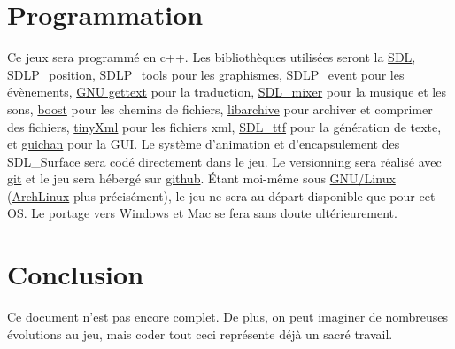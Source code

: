 \documentclass{article}
\begin{document}
\section{Programmation}
Ce jeux sera programmé en c++. Les bibliothèques utilisées seront la \href{http://www.libsdl.org/}{SDL}, \href{https://github.com/lucas8/SDLP\_position}{SDLP\_position}, \href{https://github.com/lucas8/SDLP\_tools}{SDLP\_tools} pour les graphismes, 
\href{https://github.com/lucas8/SDLP\_event}{SDLP\_event} pour les évènements, 
\href{http://www.gnu.org/software/gettext/}{GNU gettext} pour la traduction, 
\href{http://www.libsdl.org/projects/SDL\_mixer/}{SDL\_mixer} pour la musique et les sons, 
\href{http://www.boost.org/}{boost} pour les chemins de fichiers, 
\href{https://github.com/libarchive/libarchive}{libarchive} pour archiver et comprimer des fichiers, 
\href{http://www.grinninglizard.com/tinyxml/index.html}{tinyXml} pour les fichiers xml, 
\href{http://www.libsdl.org/projects/SDL\_ttf/}{SDL\_ttf} pour la génération de texte, 
et \href{http://guichan.sourceforge.net/wiki/index.php/Main\_Page}{guichan} pour la GUI. Le système d'animation et d'encapsulement des SDL\_Surface sera codé directement dans le jeu. Le versionning sera réalisé avec \href{http://git-scm.com/}{git} et le jeu sera hébergé sur \href{https://github.com/}{github}. Étant moi-même sous \href{https://fr.wikipedia.org/wiki/Linux}{GNU/Linux} (\href{http://www.archlinux.org/}{ArchLinux} plus précisément), le jeu ne sera au départ disponible que pour cet OS. Le portage vers Windows et Mac se fera sans doute ultérieurement.

\section{Conclusion}
Ce document n'est pas encore complet. De plus, on peut imaginer de nombreuses évolutions au jeu, mais coder tout ceci représente déjà un sacré travail.
\end{document}
